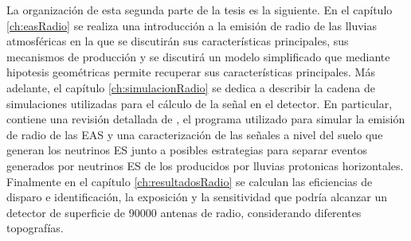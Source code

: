 La organizaci\'on de esta segunda parte de la tesis es la siguiente.
En el capítulo \ref{ch:easRadio} se realiza una introducción a la emisión de radio de las lluvias atmosféricas en la que se discutirán sus características principales, sus mecanismos de producción y se discutirá un modelo simplificado que mediante hipotesis geom\'etricas permite recuperar sus características principales.
Más adelante, el capítulo \ref{ch:simulacionRadio} se dedica a describir la cadena de simulaciones utilizadas para el c\'alculo de la se\~nal en el detector. 
En particular, contiene una revisión detallada de \zhs{}, el programa utilizado para simular la emisión de radio de las EAS y una caracterización de las señales a nivel del suelo que generan los neutrinos ES junto a posibles estrategias para separar eventos generados por neutrinos ES de los producidos por lluvias protonicas horizontales.
Finalmente en el capítulo \ref{ch:resultadosRadio} se calculan las eficiencias de disparo e identificaci\'on, la exposición y la sensitividad que podría alcanzar un detector de superficie de 90000 antenas de radio, considerando diferentes topografías.


